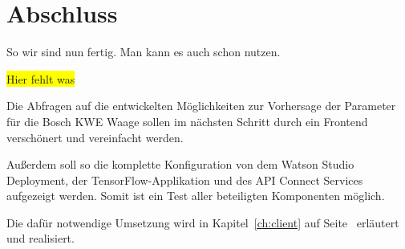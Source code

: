 \section{Abschluss}
So wir sind nun fertig. Man kann es auch schon nutzen.

\colorbox{yellow}{Hier fehlt was}

Die Abfragen auf die entwickelten Möglichkeiten zur Vorhersage der Parameter für die Bosch KWE Waage sollen im nächsten
Schritt durch ein Frontend verschönert und vereinfacht werden.

Außerdem soll so die komplette Konfiguration von dem Watson Studio Deployment, der TensorFlow-Applikation und des API
Connect Services aufgezeigt werden. Somit ist ein Test aller beteiligten Komponenten möglich.

Die dafür notwendige Umsetzung wird in Kapitel~\ref{ch:client} auf Seite~\pageref{ch:client} erläutert und realisiert.